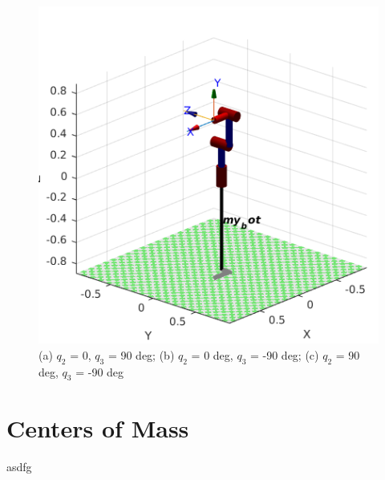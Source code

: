 \documentclass{article}
\begin{document}
\begin{center}
\begin{figure}[!htb]
\begin{minipage}{0.33\textwidth}
   \end{minipage}\hfill
   \begin{minipage}{0.33\textwidth}
     \centering
     \includegraphics[width=\linewidth]{images/frame3_q2_90_q3_-90.png}
   \end{minipage}
   \caption{(a) $q_2$ = 0, $q_3$ = 90 deg; (b) $q_2$ = 0 deg, $q_3$ = -90 deg; (c) $q_2$ = 90 deg, $q_3$ = -90 deg}

\end{figure} 
\end{center}
\FloatBarrier

\section{Centers of Mass}
asdfg
\end{document}
